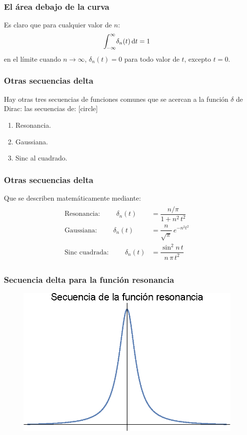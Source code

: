 \documentclass[12pt]{beamer}
\begin{document}
\begin{frame}
\frametitle{El área debajo de la curva}
Es claro que para cualquier valor de $n$:
\pause
\begin{align}
\scaleint{5ex}_{\bs -\infty}^{\infty} \delta_{n} (t) \dd{t} = 1
\label{eq:ecuacion_05_12}
\end{align}
en el límite cuando $n \to \infty$, $\delta_{n}(t) = 0$ para todo valor de $t$, excepto $t = 0$. 
\end{frame}
\begin{frame}
\frametitle{Otras secuencias delta}
Hay otras tres secuencias de funciones comunes que se acercan a la función $\delta$ de Dirac: las secuencias de:
[circle]
\begin{enumerate}[<+->]
\item Resonancia.
\item Gaussiana.
\item Sinc al cuadrado.
\end{enumerate}
\end{frame}
\begin{frame}
\frametitle{Otras secuencias delta}
Que se describen matemáticamente mediante:
\pause
\begin{align}
\begin{aligned}
\mbox{Resonancia:} \hspace{1cm} \delta_{n}(t) &= \dfrac{n/\pi}{1 + n^{2} \, t^{2}} \\[1em]
\mbox{Gaussiana:} \hspace{1cm} \delta_{n}(t) &= \dfrac{n}{\sqrt{\pi}} \, e^{-n^{2} t^{2}} \\[1em]
\mbox{Sinc cuadrada:} \hspace{1cm} \delta_{n}(t) &= \dfrac{\sin^{2} n \, t}{n \, \pi \, t^{2}} 
\end{aligned}
\label{eq:ecuacion_05_13}
\end{align}
\end{frame}
\begin{frame}
\frametitle{Secuencia delta para la función resonancia}
\begin{figure}[H]
    \centering
    \includegraphics[scale=1]{Imagenes/secuencia_Delta_05.eps}
\end{figure}
\end{frame}
\end{document}
